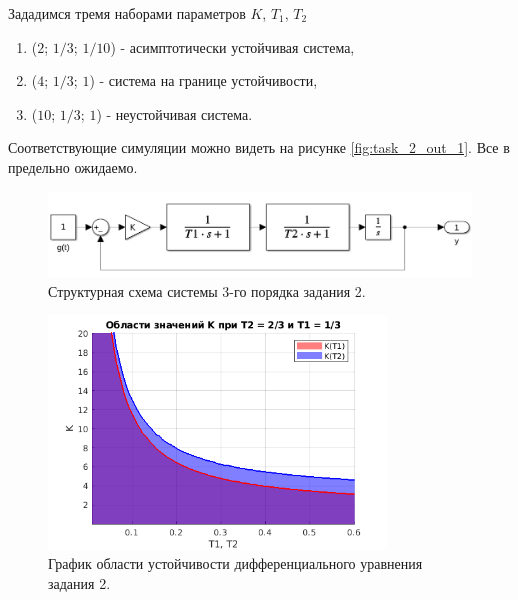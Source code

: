 Зададимся тремя наборами параметров $K$, $T_1$, $T_2$
\begin{enumerate}
    \item ($2$; $1/3$; $1/10$) - асимптотически устойчивая система,
    \item ($4$; $1/3$; $1$) - система на границе устойчивости,
    \item ($10$; $1/3$; $1$) - неустойчивая система.
\end{enumerate}
Соответствующие симуляции можно видеть на рисунке \ref{fig:task_2_out_1}. Все
в предельно ожидаемо.

\begin{figure}
    \centering
    \includegraphics[width=1\textwidth]{figs/task_2_slx.png}
    \caption{Структурная схема системы 3-го порядка задания 2.}
    \label{fig:task_2_slx}
\end{figure}

\begin{figure}
    \centering
    \includegraphics[width=0.8\textwidth]{figs/task_2_out.png}
    \caption{График области устойчивости дифференциального уравнения задания 2.}
    \label{fig:task_2_out}
\end{figure}

